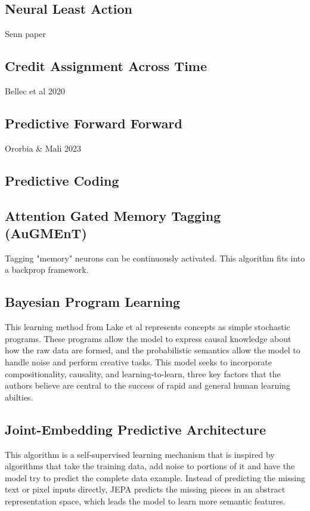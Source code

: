 \documentclass[11pt, a4paper]{article}
\begin{document}
\subsection{Neural Least Action}
Senn paper

\subsection{Credit Assignment Across Time}
Bellec et al 2020

\subsection{Predictive Forward Forward}
Ororbia \& Mali 2023

\subsection{Predictive Coding}

\subsection{Attention Gated Memory Tagging (AuGMEnT)}
Tagging "memory" neurons can be continuously activated. This algorithm fits into a backprop framework.


\subsection{Bayesian Program Learning}
This learning method from Lake et al represents concepts as simple stochastic programs.  These programs allow the model to express causal knowledge about how the raw data are formed, and the probabilistic semantics allow the model to handle noise and perform creative tasks. This model seeks to incorporate compositionality, causality, and learning-to-learn, three key factors that the authors believe are central to the success of rapid and general human learning abilties.

\subsection{Joint-Embedding Predictive Architecture}
This algorithm is a self-supervised learning mechanism that is inspired by algorithms that take the training data, add noise to portions of it and have the model try to predict the complete data example. Instead of predicting the missing text or pixel inputs directly, JEPA predicts the missing pieces in an abstract representation space, which leads the model to learn more semantic features.
\end{document}
